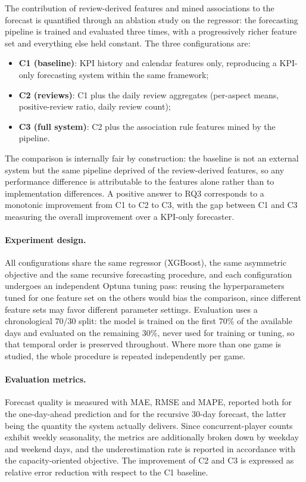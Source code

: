 \noindent The contribution of review-derived features and mined associations to the forecast is quantified through an ablation study on the regressor: the forecasting pipeline is trained and evaluated three times, with a progressively richer feature set and everything else held constant. The three configurations are:
\begin{itemize}
    \item \textbf{C1 (baseline)}: KPI history and calendar features only, reproducing a KPI-only forecasting system within the same framework;
    \item \textbf{C2 (reviews)}: C1 plus the daily review aggregates (per-aspect means, positive-review ratio, daily review count);
    \item \textbf{C3 (full system)}: C2 plus the association rule features mined by the pipeline.
\end{itemize}
The comparison is internally fair by construction: the baseline is not an external system but the same pipeline deprived of the review-derived features, so any performance difference is attributable to the features alone rather than to implementation differences. A positive answer to RQ3 corresponds to a monotonic improvement from C1 to C2 to C3, with the gap between C1 and C3 measuring the overall improvement over a KPI-only forecaster.

\paragraph{Experiment design.} All configurations share the same regressor (XGBoost), the same asymmetric objective and the same recursive forecasting procedure, and each configuration undergoes an independent Optuna tuning pass: reusing the hyperparameters tuned for one feature set on the others would bias the comparison, since different feature sets may favor different parameter settings. Evaluation uses a chronological 70/30 split: the model is trained on the first 70\% of the available days and evaluated on the remaining 30\%, never used for training or tuning, so that temporal order is preserved throughout. Where more than one game is studied, the whole procedure is repeated independently per game.

\paragraph{Evaluation metrics.} Forecast quality is measured with MAE, RMSE and MAPE, reported both for the one-day-ahead prediction and for the recursive 30-day forecast, the latter being the quantity the system actually delivers. Since concurrent-player counts exhibit weekly seasonality, the metrics are additionally broken down by weekday and weekend days, and the underestimation rate is reported in accordance with the capacity-oriented objective. The improvement of C2 and C3 is expressed as relative error reduction with respect to the C1 baseline.

